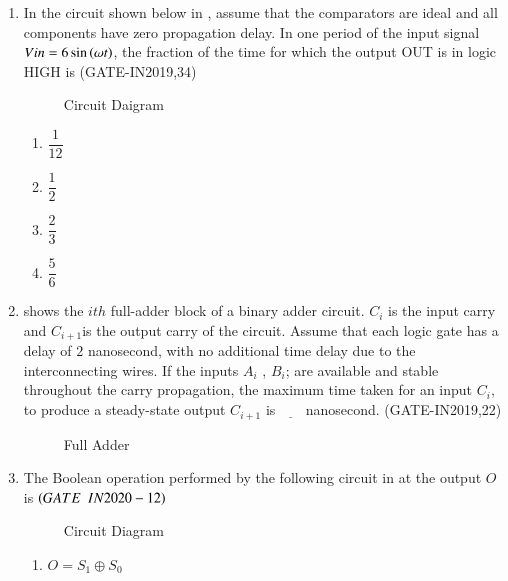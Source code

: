 \begin{enumerate}[label=\arabic*.,ref=\theenumi]
\item In the circuit shown below in 
	    ,
	 assume that the comparators are ideal and all components have zero propagation delay. In one period of the input signal $Vin=6\sin\left(\omega t\right)$, the fraction of the time for which the output OUT is in logic HIGH is 
		                 \hfill(GATE-IN2019,34)
\begin{figure}[H]
\centering
\resizebox{\columnwidth}{!}{%
    
	}
	    \caption{Circuit Daigram}
	    \label{fig:GATE-IN2019,34}
     \end{figure}
\begin{enumerate}
	\item $\dfrac{1}{12}$
	\item $\dfrac{1}{2}$
	\item $\dfrac{2}{3}$
	\item $\dfrac{5}{6}$
\end{enumerate}


\item 
	shows the $ith$ full-adder block of a binary adder circuit. $C_i$ is the input carry and $C_{i+1}$is the output carry of the circuit. Assume that each logic gate has a delay of $2$ nanosecond, with no additional time delay due to the interconnecting wires. If the inputs $A_i$ , $B_i$; are available and stable throughout the carry propagation, the maximum time taken for an input $C_i$, to produce a steady-state output $C_{i+1}$ is $\underline{\hspace{18pt}}$ nanosecond.
	               \hfill(GATE-IN2019,22)
\begin{figure}[H] 
    \centering
    \resizebox{\columnwidth}{!}{%
	
	}
	\caption{Full Adder}
	\label{fig:GATE-IN2019,22}
\end{figure}
\item The Boolean operation performed by the following  circuit 
in
	at the output $O$ is \underline{\hspace{2cm}}
    $\hfill\brak{GATE \enspace IN2020-12}$

\begin{figure}[H]
	\centering
	\resizebox{\columnwidth}{!}{%

	}
\caption{Circuit Diagram}
\label{fig:figure13}
\end{figure}

\begin{enumerate}

            \item  $O=S_1\oplus S_0$ 
            

\end{enumerate}
\end{enumerate}
